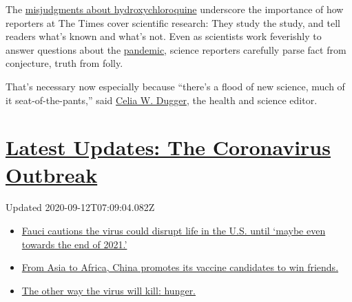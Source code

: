 The
\href{https://www.nytimes3xbfgragh.onion/2020/05/21/us/politics/trump-fact-check-hydroxychloroquine-coronavirus-.html}{misjudgments
about hydroxychloroquine} underscore the importance of how reporters at
The Times cover scientific research: They study the study, and tell
readers what's known and what's not. Even as scientists work feverishly
to answer questions about the
\href{https://www.nytimes3xbfgragh.onion/news-event/coronavirus?action=click\&pgtype=Article\&state=default\&module=styln-coronavirus\&variant=show\&region=TOP_BANNER\&context=storylines_menu}{pandemic},
science reporters carefully parse fact from conjecture, truth from
folly.

That's necessary now especially because ``there's a flood of new
science, much of it seat-of-the-pants,'' said
\href{https://www.nytimes3xbfgragh.onion/by/celia-w-dugger}{Celia W.
Dugger}, the health and science editor.

\hypertarget{latest-updates-the-coronavirus-outbreak}{%
\section{\texorpdfstring{\href{https://www.nytimes3xbfgragh.onion/2020/09/11/world/covid-19-coronavirus.html?action=click\&pgtype=Article\&state=default\&region=MAIN_CONTENT_1\&context=storylines_live_updates}{Latest
Updates: The Coronavirus
Outbreak}}{Latest Updates: The Coronavirus Outbreak}}\label{latest-updates-the-coronavirus-outbreak}}

Updated 2020-09-12T07:09:04.082Z

\begin{itemize}
\tightlist
\item
  \href{https://www.nytimes3xbfgragh.onion/2020/09/11/world/covid-19-coronavirus.html?action=click\&pgtype=Article\&state=default\&region=MAIN_CONTENT_1\&context=storylines_live_updates\#link-dfb8a16}{Fauci
  cautions the virus could disrupt life in the U.S. until `maybe even
  towards the end of 2021.'}
\item
  \href{https://www.nytimes3xbfgragh.onion/2020/09/11/world/covid-19-coronavirus.html?action=click\&pgtype=Article\&state=default\&region=MAIN_CONTENT_1\&context=storylines_live_updates\#link-7104d154}{From
  Asia to Africa, China promotes its vaccine candidates to win friends.}
\item
  \href{https://www.nytimes3xbfgragh.onion/2020/09/11/world/covid-19-coronavirus.html?action=click\&pgtype=Article\&state=default\&region=MAIN_CONTENT_1\&context=storylines_live_updates\#link-393ad215}{The
  other way the virus will kill: hunger.}
\end{itemize}

